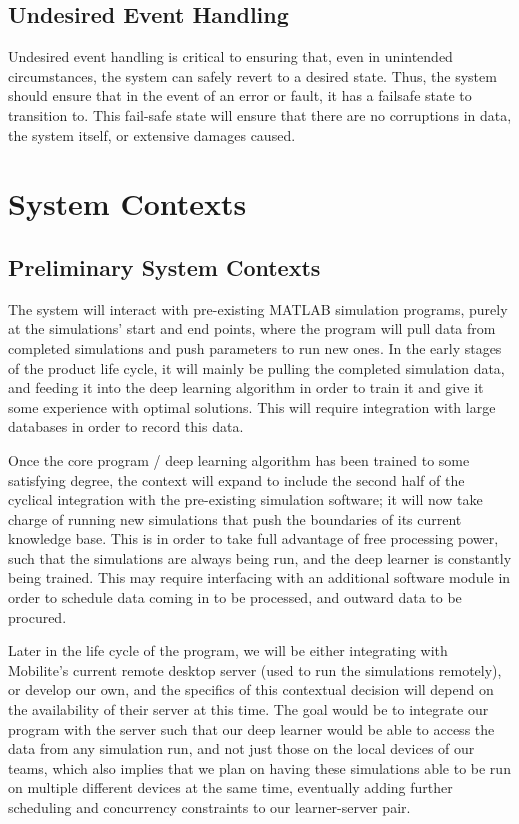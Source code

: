 \documentclass[12pt, titlepage]{article}
\begin{document}
\subsection{Undesired Event Handling}
Undesired event handling is critical to ensuring that, even in unintended circumstances, the system can safely revert to a desired state. Thus, the system should ensure that in the event of an error or fault, it has a failsafe state to transition to. This fail-safe state will ensure that there are no corruptions in data, the system itself, or extensive damages caused. 

\section{System Contexts}

\subsection{Preliminary System Contexts}
\par
The system will interact with pre-existing MATLAB simulation programs, purely at the simulations’ start and end points, where the program will pull data from completed simulations and push parameters to run new ones. In the early stages of the product life cycle, it will mainly be pulling the completed simulation data, and feeding it into the deep learning algorithm in order to train it and give it some experience with optimal solutions. This will require integration with large databases in order to record this data. 
\par
Once the core program / deep learning algorithm has been trained to some satisfying degree, the context will expand to include the second half of the cyclical integration with the pre-existing simulation software; it will now take charge of running new simulations that push the boundaries of its current knowledge base. This is in order to take full advantage of free processing power, such that the simulations are always being run, and the deep learner is constantly being trained. This may require interfacing with an additional software module in order to schedule data coming in to be processed, and outward data to be procured.
\par 
Later in the life cycle of the program, we will be either integrating with Mobilite’s current remote desktop server (used to run the simulations remotely), or develop our own, and the specifics of this contextual decision will depend on the availability of their server at this time. The goal would be to integrate our program with the server such that our deep learner would be able to access the data from any simulation run, and not just those on the local devices of our teams, which also implies that we plan on having these simulations able to be run on multiple different devices at the same time, eventually adding further scheduling and concurrency constraints to our learner-server pair. 
\end{document}
